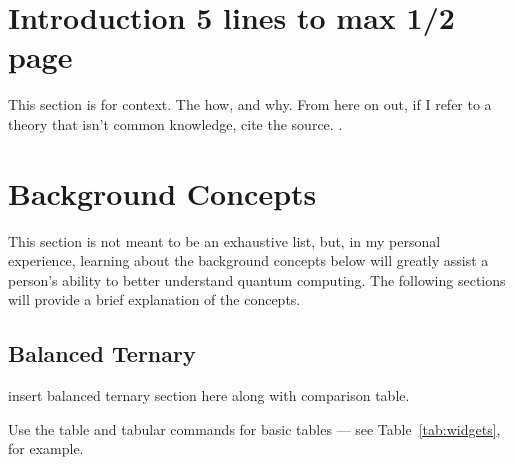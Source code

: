 \documentclass[a4paper]{article}
\begin{document}
\section{Introduction 5 lines to max 1/2 page}
\label{sec:introduction}




This section is for context.  The how, and why.  From here on out, if I refer to a theory that isn't common knowledge, cite the source. \cite{junctNew}.


\section{Background Concepts}
\label{sec:backgroundconcepts}
This section is not meant to be an exhaustive list, but, in my personal experience, learning about the background concepts below will greatly assist a person’s ability to better understand quantum computing.  The following sections will provide a brief explanation of the concepts.
\subsection{Balanced Ternary} %
insert balanced ternary section here along with comparison table.


Use the table and tabular commands for basic tables --- see Table~\ref{tab:widgets}, for example.
\end{document}
